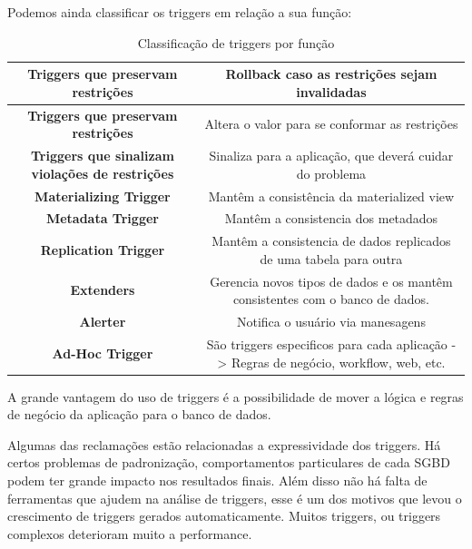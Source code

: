 \documentclass[conference]{IEEEtran}
\begin{document}
    Podemos ainda classificar os triggers em relação a sua função:
 \begin{table}[!t]
    \renewcommand{\arraystretch}{1}
    \caption{Classificação de triggers por função}
    \label{table_example}
    \centering
    \begin{tabular}{ c  c  }
      \hline 
           \bfseries Triggers que preservam restrições &
           Rollback caso as restrições sejam invalidadas \\
      \hline 
            \bfseries Triggers que preservam restrições &
           Altera o valor para se conformar as restrições \\
      \hline 
            \bfseries Triggers que sinalizam violações de restrições &
           Sinaliza para a aplicação, que deverá cuidar do problema \\
      \hline 
            \bfseries Materializing Trigger &
           Mantêm a consistência da materialized view \\
      \hline 
           \bfseries Metadata Trigger &
           Mantêm a consistencia dos metadados \\
      \hline 
           \bfseries Replication Trigger &
           Mantêm a consistencia de dados replicados de uma tabela para outra \\
      \hline 
           \bfseries Extenders &
           Gerencia novos tipos de dados e os mantêm consistentes com o banco de dados. \\
      \hline 
          \bfseries  Alerter &
           Notifica o usuário via manesagens \\
      \hline 
           \bfseries  Ad-Hoc Trigger &
            São triggers especificos para cada aplicação -> Regras de negócio, workflow, web, etc. \\
        \end{tabular}
    \end{table}

    A grande vantagem do uso de triggers é a possibilidade de mover a lógica e regras de negócio da aplicação para o banco de dados.

    Algumas das reclamações estão relacionadas a expressividade dos triggers. Há certos problemas de padronização, comportamentos particulares de cada SGBD podem ter grande impacto nos resultados finais. Além disso não há falta de ferramentas que ajudem na análise de triggers, esse é um dos motivos que levou o crescimento de triggers gerados automaticamente. Muitos triggers, ou triggers complexos deterioram muito a performance.
\end{document}
